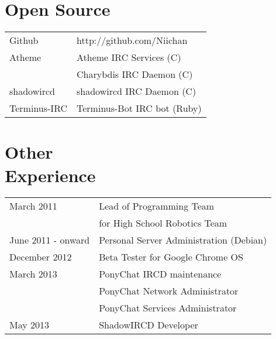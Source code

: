 \documentclass[line, margin, 10pt]{res}
\begin{document}
\begin{resume}
\section{Open Source}
\begin{tabular}{l l}
Github & http://github.com/Niichan \\ [5pt]
Atheme & Atheme IRC Services (C) \\ [5pt]
& Charybdis IRC Daemon (C) \\ [5pt]
shadowircd & shadowircd IRC Daemon (C) \\ [5pt]
Terminus-IRC & Terminus-Bot IRC bot (Ruby) \\ [5pt]
\end{tabular}
     
\section{Other \\ Experience}
\begin{tabular}{l l}
March 2011 & Lead of Programming Team \\ [5pt]
 & for High School Robotics Team \\ [10pt]
June 2011 - onward & Personal Server Administration (Debian) \\ [10pt]
December 2012 & Beta Tester for Google Chrome OS \\ [10pt]
March 2013 & PonyChat IRCD maintenance  \\ [5pt]
 & PonyChat Network Administrator \\ [5pt]
 & PonyChat Services Administrator \\ [10pt]
May 2013 & ShadowIRCD Developer \\ [5pt]
\end{tabular}
     
\end{resume}
\end{document}
